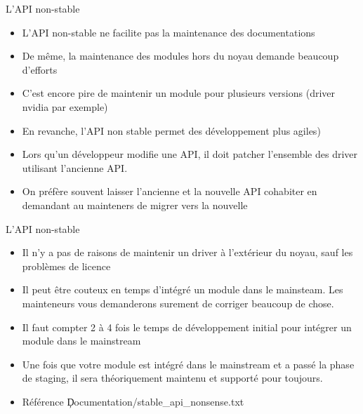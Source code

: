 \begin{frame}[fragile=singleslide]{L'API non-stable}
  \begin{itemize} 
  \item  L'API   non-stable  ne   facilite  pas  la   maintenance  des
    documentations
  \item  De même,  la maintenance  des modules  hors du  noyau demande
    beaucoup d'efforts
  \item  C'est  encore pire  de  maintenir  un  module pour  plusieurs
    versions (driver nvidia par exemple)
  \item En  revanche, l'API non  stable permet des  développement plus
    agiles)
  \item  Lors  qu'un développeur  modifie  une  API,  il doit  patcher
    l'ensemble des driver utilisant l'ancienne API.
  \item  On préfère  souvent  laisser l'ancienne  et  la nouvelle  API
    cohabiter en demandant au mainteners de migrer vers la nouvelle
  \end{itemize}
\end{frame}

\begin{frame}[fragile=singleslide]{L'API non-stable}
  \begin{itemize} 
  \item Il n'y  a pas de raisons de maintenir  un driver à l'extérieur
    du noyau, sauf les problèmes de licence
  \item  Il peut être  couteux en  temps d'intégré  un module  dans le
    mainsteam. Les  mainteneurs vous demanderons  surement de corriger
    beaucoup de chose.
  \item Il faut  compter 2 à 4 fois le  temps de développement initial
    pour intégrer un module dans le mainstream
  \item Une fois que votre module  est intégré dans le mainstream et a
    passé  la phase  de  staging, il  sera  théoriquement maintenu  et
    supporté pour toujours.
  \item Référence \c{Documentation/stable_api_nonsense.txt}
  \end{itemize} 
\end{frame} 

